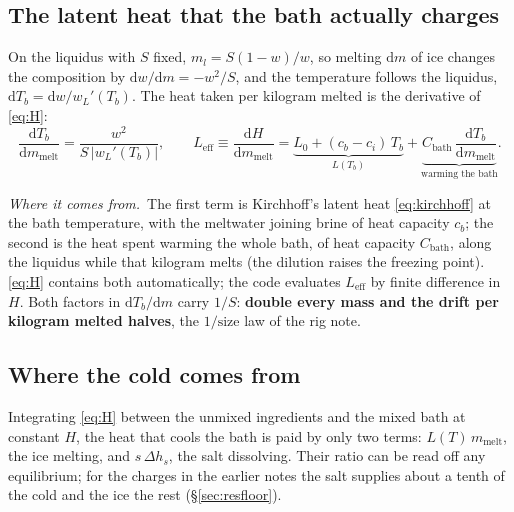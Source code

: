 \documentclass[11pt,a4paper]{article}
\newcommand{\where}{\par\noindent\textit{Where it comes from.}\ }
\begin{document}
\subsection{The latent heat that the bath actually charges}
\label{sec:Leff}
On the liquidus with $S$ fixed, $m_l = S(1-w)/w$, so melting $\mathrm dm$ of ice changes the
composition by $\mathrm dw/\mathrm dm = -w^2/S$, and the temperature follows the liquidus,
$\mathrm dT_b = \mathrm dw / w_L'(T_b)$. The heat taken per kilogram melted is the derivative of
\eqref{eq:H}:
\begin{equation}
\frac{\mathrm dT_b}{\mathrm dm_{\text{melt}}} = \frac{w^2}{S\,\lvert w_L'(T_b)\rvert},
\qquad
L_{\text{eff}} \equiv \frac{\mathrm dH}{\mathrm dm_{\text{melt}}}
 = \underbrace{L_0 + (c_b - c_i)\,T_b}_{L(T_b)}
 + \underbrace{C_{\text{bath}}\,\frac{\mathrm dT_b}{\mathrm dm_{\text{melt}}}}_{\text{warming the bath}} .
\label{eq:Leff}
\end{equation}
\where The first term is Kirchhoff's latent heat \eqref{eq:kirchhoff} at the bath temperature, with
the meltwater joining brine of heat capacity $c_b$; the second is the heat spent warming the whole
bath, of heat capacity $C_{\text{bath}}$, along the liquidus while that kilogram melts (the dilution
raises the freezing point). \eqref{eq:H} contains both automatically; the code evaluates $L_{\text{eff}}$
by finite difference in $H$. Both factors in $\mathrm dT_b/\mathrm dm$ carry $1/S$: \textbf{double every
mass and the drift per kilogram melted halves}, the $1/\text{size}$ law of the rig note.

\subsection{Where the cold comes from}
Integrating \eqref{eq:H} between the unmixed ingredients and the mixed bath at constant $H$, the heat
that cools the bath is paid by only two terms: $L(T)\,m_{\text{melt}}$, the ice melting, and
$s\,\Delta h_s$, the salt dissolving. Their ratio can be read off any equilibrium; for the charges in the
earlier notes the salt supplies about a tenth of the cold and the ice the rest (§\ref{sec:resfloor}).
\end{document}
